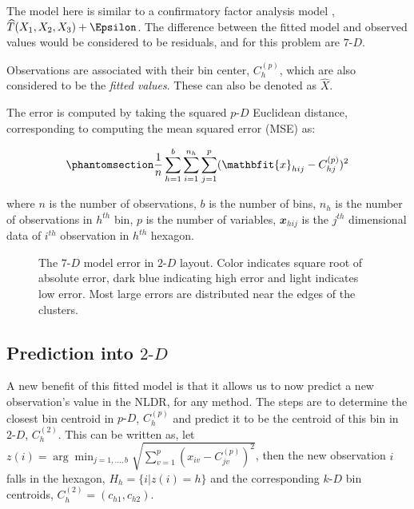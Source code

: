 \documentclass[
  12pt]{article}
\newcommand\pD{$p\text{-}D$}
\newcommand\kD{$k\text{-}D$}
\newcommand\gD{$2\text{-}D$}
\begin{document}
The model here is similar to a confirmatory factor analysis model
\citep{brown2015}, \(\widehat{T}(X_1, X_2, X_3) + \Epsilon\). The
difference between the fitted model and observed values would be
considered to be residuals, and for this problem are \(7\text{-}D\).

Observations are associated with their bin center, \(C_{h}^{(p)}\),
which are also considered to be the \emph{fitted values}. These can also
be denoted as \(\widehat{X}\).

The error is computed by taking the squared \pD{} Euclidean distance,
corresponding to computing the mean squared error (MSE) as:

\begin{equation}\phantomsection\label{eq-equation1}{\frac{1}{n}\sum_{h = 1}^{b}\sum_{i = 1}^{n_h}\sum_{j = 1}^{p} (\mathbfit{x}_{hij} - C^{(p)}_{hj})^2}\end{equation}

where \(n\) is the number of observations, \(b\) is the number of bins,
\(n_h\) is the number of observations in \(h^{th}\) bin, \(p\) is the
number of variables, \(\mathbfit{x}_{hij}\) is the \(j^{th}\)
dimensional data of \(i^{th}\) observation in \(h^{th}\) hexagon.

\begin{figure}[H]


\caption{\label{fig-p-d-error-in-2d-two-curvy}The \(7\text{-}D\) model
error in \gD{} layout. Color indicates square root of absolute error,
dark blue indicating high error and light indicates low error. Most
large errors are distributed near the edges of the clusters.}

\end{figure}%

\subsection{\texorpdfstring{Prediction into
\gD{}}{Prediction into }}\label{prediction-into}

A new benefit of this fitted model is that it allows us to now predict a
new observation's value in the NLDR, for any method. The steps are to
determine the closest bin centroid in \pD{}, \(C^{(p)}_{h}\) and predict
it to be the centroid of this bin in \gD{}, \(C^{(2)}_{h}\). This can be
written as, let
\(z(i) = \arg\min_{j = 1, \dots, b} \sqrt{\sum_{v=1}^{p}(x_{iv} - C^{(p)}_{jv})^2}\),
then the new observation \(i\) falls in the hexagon,
\(H_h = \{i| z(i) = h\}\) and the corresponding \kD{} bin centroids,
\(C_{h}^{(2)} = (c_{h1}, c_{h2})\).
\end{document}

